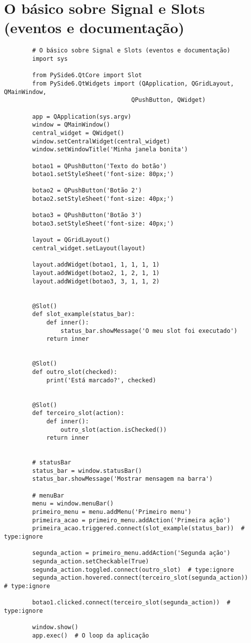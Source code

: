 \documentclass[12pt,a4paper]{article}
\begin{document}
    \section{O básico sobre Signal e Slots (eventos e documentação)}
    \begin{lstlisting}
        # O básico sobre Signal e Slots (eventos e documentação)
        import sys

        from PySide6.QtCore import Slot
        from PySide6.QtWidgets import (QApplication, QGridLayout, QMainWindow,
                                    QPushButton, QWidget)

        app = QApplication(sys.argv)
        window = QMainWindow()
        central_widget = QWidget()
        window.setCentralWidget(central_widget)
        window.setWindowTitle('Minha janela bonita')

        botao1 = QPushButton('Texto do botão')
        botao1.setStyleSheet('font-size: 80px;')

        botao2 = QPushButton('Botão 2')
        botao2.setStyleSheet('font-size: 40px;')

        botao3 = QPushButton('Botão 3')
        botao3.setStyleSheet('font-size: 40px;')

        layout = QGridLayout()
        central_widget.setLayout(layout)

        layout.addWidget(botao1, 1, 1, 1, 1)
        layout.addWidget(botao2, 1, 2, 1, 1)
        layout.addWidget(botao3, 3, 1, 1, 2)


        @Slot()
        def slot_example(status_bar):
            def inner():
                status_bar.showMessage('O meu slot foi executado')
            return inner


        @Slot()
        def outro_slot(checked):
            print('Está marcado?', checked)


        @Slot()
        def terceiro_slot(action):
            def inner():
                outro_slot(action.isChecked())
            return inner


        # statusBar
        status_bar = window.statusBar()
        status_bar.showMessage('Mostrar mensagem na barra')

        # menuBar
        menu = window.menuBar()
        primeiro_menu = menu.addMenu('Primeiro menu')
        primeira_acao = primeiro_menu.addAction('Primeira ação')
        primeira_acao.triggered.connect(slot_example(status_bar))  # type:ignore

        segunda_action = primeiro_menu.addAction('Segunda ação')
        segunda_action.setCheckable(True)
        segunda_action.toggled.connect(outro_slot)  # type:ignore
        segunda_action.hovered.connect(terceiro_slot(segunda_action))  # type:ignore

        botao1.clicked.connect(terceiro_slot(segunda_action))  # type:ignore

        window.show()
        app.exec()  # O loop da aplicação
    \end{lstlisting}
\end{document}
